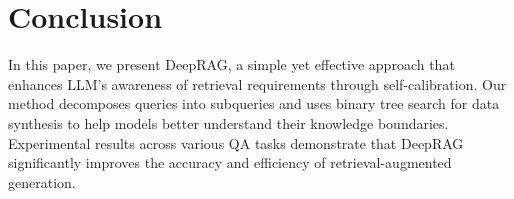 \section{Conclusion}


In this paper, we present DeepRAG, a simple yet effective approach that enhances LLM's awareness of retrieval requirements through self-calibration. 
Our method decomposes queries into subqueries and uses binary tree search for data synthesis to help models better understand their knowledge boundaries.
Experimental results across various QA tasks demonstrate that DeepRAG significantly improves the accuracy and efficiency of retrieval-augmented generation.

